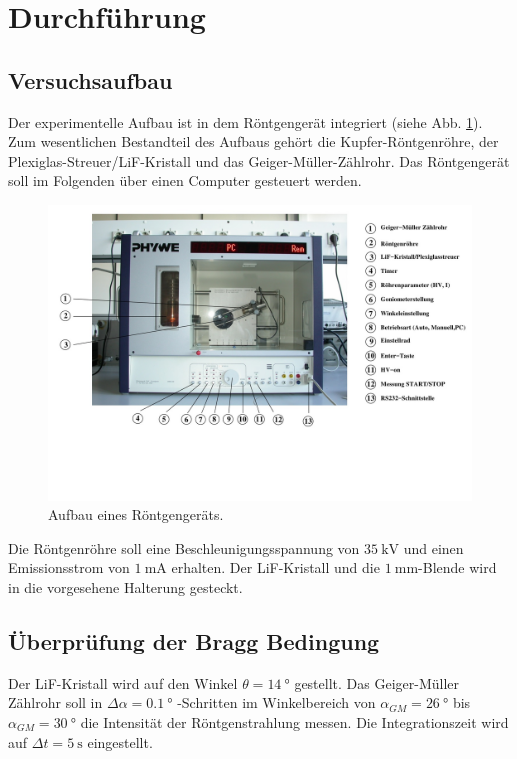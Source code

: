 \section{Durchführung}
\label{sec:Durchführung}

\subsection{Versuchsaufbau}
Der experimentelle Aufbau ist in dem Röntgengerät integriert (siehe Abb. \ref{fig:aufbau}).
Zum wesentlichen Bestandteil des Aufbaus gehört die Kupfer-Röntgenröhre, der Plexiglas-Streuer/LiF-Kristall und das Geiger-Müller-Zählrohr.
Das Röntgengerät soll im Folgenden über einen Computer gesteuert werden.
\begin{figure}
    \centering
    \includegraphics[width=\textwidth]{content/data/aufbau.jpg}
    \caption{Aufbau eines Röntgengeräts. \cite[3]{anleitung}}
    \label{fig:aufbau}
\end{figure}
Die Röntgenröhre soll eine Beschleunigungsspannung von $\SI{35}{\kilo\volt}$ und einen Emissionsstrom von $\SI{1}{\milli\ampere}$ erhalten.
Der LiF-Kristall und die $\SI{1}{\milli\metre}$-Blende wird in die vorgesehene Halterung gesteckt.
\FloatBarrier

\subsection{Überprüfung der Bragg Bedingung}
Der LiF-Kristall wird auf den Winkel $\theta = \SI{14}{\degree}$ gestellt.
Das Geiger-Müller Zählrohr soll in $\Delta \alpha = \SI{0.1}{\degree}$ -Schritten im Winkelbereich von $\alpha_{GM} = \SI{26}{\degree}$ bis $\alpha_{GM} = \SI{30}{\degree}$ die Intensität der Röntgenstrahlung messen.
Die Integrationszeit wird auf $\Delta t = \SI{5}{\second}$ eingestellt.

